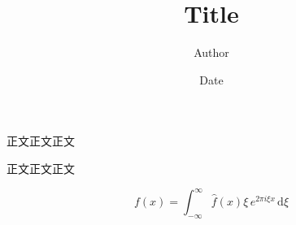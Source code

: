 \documentclass{article}
\title{Title}
\author{Author}
\date{Date}
\begin{document}
\maketitle

正文正文正文

正文正文正文

\begin{equation*}
    f(x) = \int_{-\infty}^\infty  \hat f(x)\xi\,e^{2 \pi i \xi x}  \,\mathrm{d}\xi 
\end{equation*}
\end{document}

